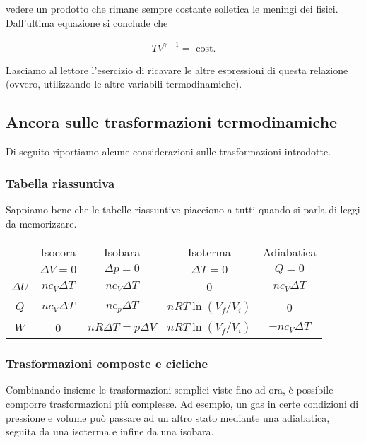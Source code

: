 \noindent vedere un prodotto che rimane sempre costante solletica le
meningi dei fisici. Dall'ultima equazione si conclude che

\begin{align}
    TV^{\gamma - 1} = \text{ cost.}\label{lativuu}
\end{align}

\noindent Lasciamo al lettore l'esercizio di ricavare le altre
espressioni di questa relazione (ovvero, utilizzando le altre
variabili termodinamiche).

\subsection{Ancora sulle trasformazioni termodinamiche}
Di seguito riportiamo alcune considerazioni sulle trasformazioni
introdotte.

\subsubsection*{Tabella riassuntiva}
Sappiamo bene che le tabelle riassuntive piacciono a tutti quando
si parla di leggi da memorizzare.

\begin{center}
    \begin{tabular}{c | c | c | c | c}
        & Isocora & Isobara & Isoterma & Adiabatica\\
        & $\Delta V = 0$ & $\Delta p = 0$ & $\Delta T = 0$ & $Q = 0$\\
        \hline
        $\Delta U$ & $nc_V\Delta T$ & $nc_V\Delta T$ & 0 & $nc_V\Delta T$\\
        \hline
        $Q$ & $nc_V\Delta T$ & $nc_p\Delta T$ & $nRT\ln(V_f/V_i)$ & 0\\
        \hline
        $W$ & 0 & $nR\Delta T = p\Delta V$ & $nRT\ln(V_f/V_i)$ & $-nc_V\Delta T$
    \end{tabular}
\end{center}

\subsubsection*{Trasformazioni composte e cicliche}
Combinando insieme le trasformazioni semplici viste fino ad ora, è possibile
comporre trasformazioni più complesse. Ad esempio, un gas in certe
condizioni di pressione e volume può passare ad un altro stato mediante
una adiabatica, seguita da una isoterma e infine da una isobara.

